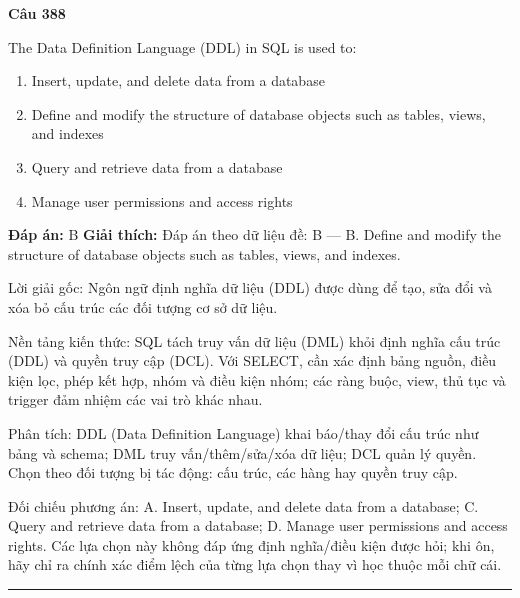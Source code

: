 \documentclass[11pt,a4paper]{article}
\newenvironment{question}[1]{%
  \par\vspace{1em}\noindent\textbf{\large Câu #1}\par\vspace{0.4em}
}{%
  \par\vspace{1em}\hrule\vspace{0.6em}
}
\newenvironment{choices}{%
  \begin{enumerate}[label=\textbf{\Alph*.},leftmargin=2.2em,itemsep=2pt,topsep=3pt]
}{%
  \end{enumerate}
}
\newcommand{\choice}{\item}
\begin{document}
\begin{question}{388}
The Data Definition Language (DDL) in SQL is used to:
\begin{choices}
\choice Insert, update, and delete data from a database
\choice Define and modify the structure of database objects such as tables, views, and indexes
\choice Query and retrieve data from a database
\choice Manage user permissions and access rights
\end{choices}
\textbf{Đáp án:} B
\textbf{Giải thích:} Đáp án theo dữ liệu đề: B — B. Define and modify the structure of database objects such as tables, views, and indexes.

Lời giải gốc: Ngôn ngữ định nghĩa dữ liệu (DDL) được dùng để tạo, sửa đổi và xóa bỏ cấu trúc các đối tượng cơ sở dữ liệu.

Nền tảng kiến thức: SQL tách truy vấn dữ liệu (DML) khỏi định nghĩa cấu trúc (DDL) và quyền truy cập (DCL). Với SELECT, cần xác định bảng nguồn, điều kiện lọc, phép kết hợp, nhóm và điều kiện nhóm; các ràng buộc, view, thủ tục và trigger đảm nhiệm các vai trò khác nhau.

Phân tích: DDL (Data Definition Language) khai báo/thay đổi cấu trúc như bảng và schema; DML truy vấn/thêm/sửa/xóa dữ liệu; DCL quản lý quyền. Chọn theo đối tượng bị tác động: cấu trúc, các hàng hay quyền truy cập.

Đối chiếu phương án: A. Insert, update, and delete data from a database; C. Query and retrieve data from a database; D. Manage user permissions and access rights. Các lựa chọn này không đáp ứng định nghĩa/điều kiện được hỏi; khi ôn, hãy chỉ ra chính xác điểm lệch của từng lựa chọn thay vì học thuộc mỗi chữ cái.
\end{question}
\end{document}
